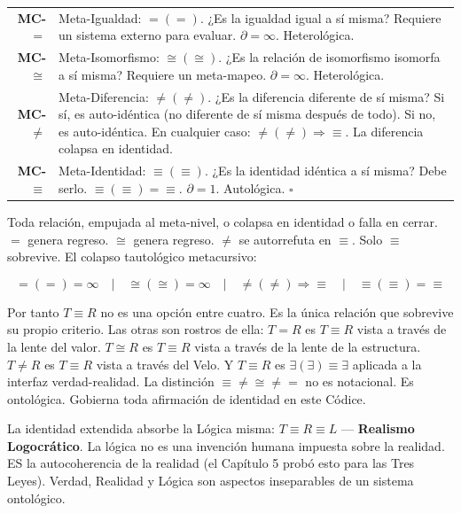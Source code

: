 \documentclass[10pt, openany, oneside]{book}
\renewcommand{\footnotesize}{\fontsize{8.5}{11}\selectfont}
\begin{document}
{\footnotesize
\noindent\begin{tabular}{r p{}}
\textbf{MC-$=$} & Meta-Igualdad: $=(=)$. ¿Es la igualdad igual a sí misma? Requiere un sistema externo para evaluar. $\partial = \infty$. Heterológica. \\[0.3em]
\textbf{MC-$\cong$} & Meta-Isomorfismo: $\cong(\cong)$. ¿Es la relación de isomorfismo isomorfa a sí misma? Requiere un meta-mapeo. $\partial = \infty$. Heterológica. \\[0.3em]
\textbf{MC-$\neq$} & Meta-Diferencia: $\neq(\neq)$. ¿Es la diferencia diferente de sí misma? Si sí, es auto-idéntica (no diferente de sí misma después de todo). Si no, es auto-idéntica. En cualquier caso: $\neq(\neq) \Rightarrow \equiv$. La diferencia colapsa en identidad. \\[0.3em]
\textbf{MC-$\equiv$} & Meta-Identidad: $\equiv(\equiv)$. ¿Es la identidad idéntica a sí misma? Debe serlo. $\equiv(\equiv) = \equiv$. $\partial = 1$. Autológica. $\square$ \\[0.3em]
\end{tabular}
}

\vspace{0.8em}

\noindent Toda relación, empujada al meta-nivel, o colapsa en identidad o falla en cerrar. $=$ genera regreso. $\cong$ genera regreso. $\neq$ se autorrefuta en $\equiv$. Solo $\equiv$ sobrevive. El colapso tautológico metacursivo:

$$\boxed{=(=) = \infty \quad | \quad \cong(\cong) = \infty \quad | \quad \neq(\neq) \Rightarrow \equiv \quad | \quad \equiv(\equiv) = \equiv}$$

Por tanto $T \equiv R$ no es una opción entre cuatro. Es la única relación que sobrevive su propio criterio. Las otras son rostros de ella: $T = R$ es $T \equiv R$ vista a través de la lente del valor. $T \cong R$ es $T \equiv R$ vista a través de la lente de la estructura. $T \neq R$ es $T \equiv R$ vista a través del Velo. Y $T \equiv R$ es $\exists(\exists) \equiv \exists$ aplicada a la interfaz verdad-realidad. La distinción $\equiv \neq \cong \neq =$ no es notacional. Es ontológica. Gobierna toda afirmación de identidad en este Códice.

La identidad extendida absorbe la Lógica misma: $T \equiv R \equiv L$ --- \textbf{Realismo Logocrático}. La lógica no es una invención humana impuesta sobre la realidad. ES la autocoherencia de la realidad (el Capítulo 5 probó esto para las Tres Leyes). Verdad, Realidad y Lógica son aspectos inseparables de un sistema ontológico.
\end{document}
